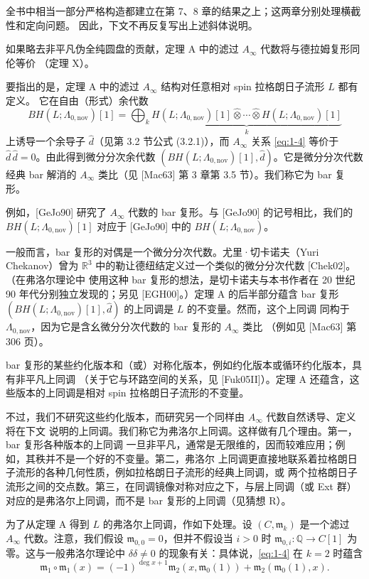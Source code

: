 全书中相当一部分严格构造都建立在第 7、8 章的结果之上；这两章分别处理横截性和定向问题。
因此，下文不再反复写出上述斜体说明。

如果略去非平凡伪全纯圆盘的贡献，定理 A 中的滤过 $A_\infty$ 代数将与德拉姆复形同伦等价
（定理 X）。

要指出的是，定理 A 中的滤过 $A_\infty$ 结构对任意相对 spin 拉格朗日子流形 $L$ 都有定义。
它在自由（形式）余代数
\[
  BH(L;\Lambda_{0,\mathrm{nov}})[1]
  =\bigoplus_k
  \underbrace{H(L;\Lambda_{0,\mathrm{nov}})[1]
  \widehat\otimes\cdots\widehat\otimes
  H(L;\Lambda_{0,\mathrm{nov}})[1]}_{k}
\]
上诱导一个余导子 $\widehat d$（见第 3.2 节公式 (3.2.1)），而 $A_\infty$ 关系
\eqref{eq:1-4} 等价于 $\widehat d\,\widehat d=0$。由此得到微分分次余代数
$(BH(L;\Lambda_{0,\mathrm{nov}})[1],\widehat d)$。它是微分分次代数经典 bar 解消的
$A_\infty$ 类比（见 [Mac63] 第 3 章第 3.5 节）。我们称它为 bar 复形。

例如，[GeJo90] 研究了 $A_\infty$ 代数的 bar 复形。与 [GeJo90] 的记号相比，我们的
$BH(L;\Lambda_{0,\mathrm{nov}})[1]$ 对应于 [GeJo90] 中的
$BH(L;\Lambda_{0,\mathrm{nov}})$。

一般而言，bar 复形的对偶是一个微分分次代数。尤里·切卡诺夫（Yuri Chekanov）曾为
$\mathbb R^3$ 中的勒让德纽结定义过一个类似的微分分次代数 [Chek02]。（在弗洛尔理论中
使用这种 bar 复形的想法，是切卡诺夫与本书作者在 20 世纪 90 年代分别独立发现的；另见
[EGH00]。）定理 A 的后半部分蕴含 bar 复形
$(BH(L;\Lambda_{0,\mathrm{nov}})[1],\widehat d)$ 的上同调是 $L$ 的不变量。然而，这个上同调
同构于 $\Lambda_{0,\mathrm{nov}}$，因为它是含幺微分分次代数的 bar 复形的 $A_\infty$ 类比
（例如见 [Mac63] 第 306 页）。

bar 复形的某些约化版本和（或）对称化版本，例如约化版本或循环约化版本，具有非平凡上同调
（关于它与环路空间的关系，见 [Fuk05II]）。定理 A 还蕴含，这些版本的上同调是相对 spin
拉格朗日子流形的不变量。

不过，我们不研究这些约化版本，而研究另一个同样由 $A_\infty$ 代数自然诱导、定义将在下文
说明的上同调。我们称它为弗洛尔上同调。这样做有几个理由。第一，bar 复形各种版本的上同调
一旦非平凡，通常是无限维的，因而较难应用；例如，其秩并不是一个好的不变量。第二，弗洛尔
上同调更直接地联系着拉格朗日子流形的各种几何性质，例如拉格朗日子流形的经典上同调，或
两个拉格朗日子流形之间的交点数。第三，在同调镜像对称对应之下，与层上同调（或 Ext 群）
对应的是弗洛尔上同调，而不是 bar 复形的上同调（见猜想 R）。

为了从定理 A 得到 $L$ 的弗洛尔上同调，作如下处理。设 $(C,\mathfrak m_k)$ 是一个滤过
$A_\infty$ 代数。注意，我们假设 $\mathfrak m_{0,0}=0$，但并不假设当 $i>0$ 时
$\mathfrak m_{0,i}\colon\mathbb Q\to C[1]$ 为零。这与一般弗洛尔理论中
$\delta\delta\neq0$ 的现象有关：具体说，\eqref{eq:1-4} 在 $k=2$ 时蕴含
\[
  \mathfrak m_1\circ\mathfrak m_1(x)
  =(-1)^{\deg x+1}\mathfrak m_2(x,\mathfrak m_0(1))
  +\mathfrak m_2(\mathfrak m_0(1),x).
\]

